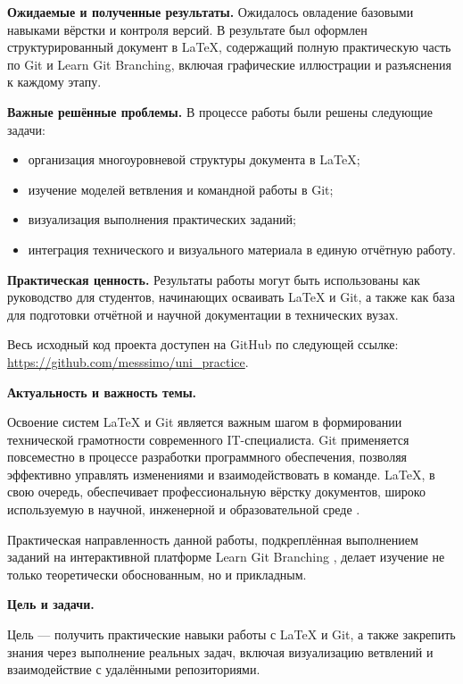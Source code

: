\documentclass[a4paper,12pt]{report}
\newcommand{\github}{\url{https://github.com/messsimo/uni_practice}}
\begin{document}
\textbf{Ожидаемые и полученные результаты.}
Ожидалось овладение базовыми навыками вёрстки и контроля версий. В результате был оформлен структурированный документ в \LaTeX{}, содержащий полную практическую часть по Git и Learn Git Branching, включая графические иллюстрации и разъяснения к каждому этапу.

\textbf{Важные решённые проблемы.}
В процессе работы были решены следующие задачи:
\begin{itemize}
  \item организация многоуровневой структуры документа в \LaTeX{};
  \item изучение моделей ветвления и командной работы в Git;
  \item визуализация выполнения практических заданий;
  \item интеграция технического и визуального материала в единую отчётную работу.
\end{itemize}

\textbf{Практическая ценность.}
Результаты работы могут быть использованы как руководство для студентов, начинающих осваивать \LaTeX{} и Git, а также как база для подготовки отчётной и научной документации в технических вузах.

Весь исходный код проекта доступен на GitHub по следующей ссылке: \github.


\introChapter

\textbf{Актуальность и важность темы.}

Освоение систем \LaTeX{} и Git \cite{latex_official_doc, progit_book} является важным шагом в формировании технической грамотности современного IT-специалиста. Git применяется повсеместно в процессе разработки программного обеспечения, позволяя эффективно управлять изменениями и взаимодействовать в команде. \LaTeX{}, в свою очередь, обеспечивает профессиональную вёрстку документов, широко используемую в научной, инженерной и образовательной среде \cite{latex_project_site, overleaf_intro}.

Практическая направленность данной работы, подкреплённая выполнением заданий на интерактивной платформе Learn Git Branching \cite{learngitbranching}, делает изучение не только теоретически обоснованным, но и прикладным.

\textbf{Цель и задачи.}

Цель — получить практические навыки работы с \LaTeX{} и Git, а также закрепить знания через выполнение реальных задач, включая визуализацию ветвлений и взаимодействие с удалёнными репозиториями.
\end{document}
